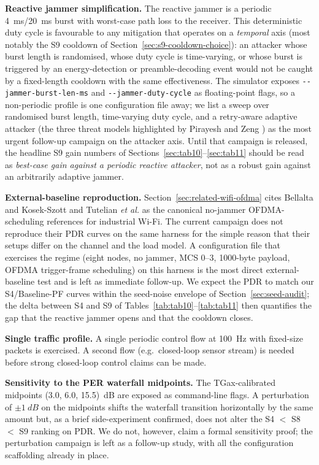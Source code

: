 \documentclass[journal,onecolumn,11pt,a4paper]{IEEEtran}
\begin{document}
\textbf{Reactive jammer simplification.} The reactive jammer is a
periodic \SI{4}{ms}/\SI{20}{ms} burst with worst-case path loss to
the receiver. This deterministic duty cycle is favourable to any
mitigation that operates on a \emph{temporal} axis (most notably
the S9 cooldown of Section~\ref{sec:s9-cooldown-choice}): an
attacker whose burst length is randomised, whose duty cycle is
time-varying, or whose burst is triggered by an energy-detection
or preamble-decoding event would not be caught by a fixed-length
cooldown with the same effectiveness. The simulator exposes
\texttt{-{}-jammer-burst-len-ms} and \texttt{-{}-jammer-duty-cycle}
as floating-point flags, so a non-periodic profile is one
configuration file away; we list a sweep over randomised burst
length, time-varying duty cycle, and a retry-aware adaptive
attacker (the three threat models highlighted by Pirayesh and
Zeng \cite{Gri21}) as the most urgent follow-up campaign on the
attacker axis. Until that campaign is released, the headline
S9 gain numbers of Sections~\ref{sec:tab10}--\ref{sec:tab11}
should be read as \emph{best-case gain against a periodic
reactive attacker}, not as a robust gain against an arbitrarily
adaptive jammer.

\textbf{External-baseline reproduction.} Section~\ref{sec:related-wifi-ofdma}
cites Bellalta and Kosek-Szott \cite{Bel19} and Tutelian
\emph{et al.}\xspace \cite{Tut21} as the canonical no-jammer OFDMA-scheduling
references for industrial Wi-Fi. The current campaign does not
reproduce their PDR curves on the same harness for the simple
reason that their setups differ on the channel and the load model.
A configuration file that exercises the \cite{Bel19} regime
(eight nodes, no jammer, MCS 0--3, 1000-byte payload, OFDMA
trigger-frame scheduling) on this harness is the most direct
external-baseline test and is left as immediate follow-up. We
expect the \cite{Bel19} PDR to match our S4/Baseline-PF curves
within the seed-noise envelope of Section~\ref{sec:seed-audit};
the delta between S4 and S9 of
Tables~\ref{tab:tab10}--\ref{tab:tab11} then quantifies the gap
that the reactive jammer opens and that the cooldown closes.

\textbf{Single traffic profile.} A single periodic control flow at
\SI{100}{Hz} with fixed-size packets is exercised. A second flow
(e.g.\ closed-loop sensor stream) is needed before strong closed-loop
control claims can be made.

\textbf{Sensitivity to the PER waterfall midpoints.} The
TGax-calibrated midpoints (3.0, 6.0, 15.5)~dB are exposed as
command-line flags. A perturbation of $\pm \SI{1}{dB}$ on the
midpoints shifts the waterfall transition horizontally by the same
amount but, as a brief side-experiment confirmed, does not alter the
S4 $<$ S8 $<$ S9 ranking on PDR. We do not, however, claim a formal
sensitivity proof; the perturbation campaign is left as a follow-up
study, with all the configuration scaffolding already in place.
\end{document}
